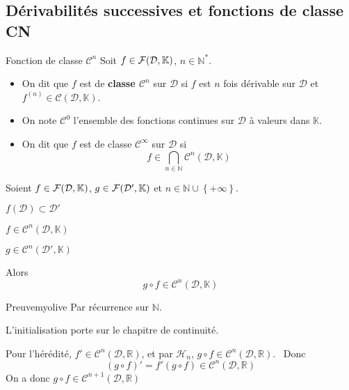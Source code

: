 \subsection{Dérivabilités successives et fonctions de classe CN}

    \begin{defi}{Fonction de classe $\mathcal{C}^n$}{}
        Soit $f \in \mathcal{F}(\mathcal{D},\mathbb{K})$, $n \in \mathbb{N}^*$.
        \begin{itemize}
            \item On dit que $f$ est de \textbf{classe $\mathcal{C}^n$} sur $\mathcal{D}$ si $f$ est $n$ fois dérivable sur $\mathcal{D}$ et $f^{(n)} \in \mathcal{C}(\mathcal{D},\mathbb{K})$.
            \item On note $\mathcal{C}^0$ l’ensemble des fonctions continues sur $\mathcal{D}$ à valeurs dans $\mathbb{K}$.
            \item On dit que $f$ est de classe $\mathcal{C}^{\infty}$ sur $\mathcal{D}$ si \[ f \in \bigcap\limits_{n \in \mathbb{N}} \mathcal{C}^n(\mathcal{D},\mathbb{K}) \]
        \end{itemize}
    \end{defi}

    \begin{prop}{}{}
        Soient $f \in \mathcal{F}(\mathcal{D},\mathbb{K})$, $g \in \mathcal{F}(\mathcal{D'},\mathbb{K})$ et $n \in \mathbb{N} \cup \left\{ + \infty \right\}$. 

        \begin{suppose}
            \item $f(\mathcal{D}) \subset \mathcal{D}'$
            \item $f \in \mathcal{C}^n(\mathcal{D},\mathbb{K})$
            \item $g \in \mathcal{C}^n(\mathcal{D}',\mathbb{K})$
        \end{suppose}

        Alors \[ g \circ f \in \mathcal{C}^n(\mathcal{D},\mathbb{K}) \]
    \end{prop}

    \begin{demo}{Preuve}{myolive}
        Par récurrence sur $\mathbb{N}$.
        
        L’initialisation porte sur le chapitre de continuité.
        
        Pour l’hérédité, $f' \in \mathcal{C}^n(\mathcal{D},\mathbb{R})$, et par $\mathcal{H}_n$, $g \circ f \in \mathcal{C}^n(\mathcal{D},\mathbb{R})$. 
        \
        Donc \[ (g \circ f)' = f' (g \circ f) \in \mathcal{C}^n(\mathcal{D},\mathbb{R}) \] 
        On a donc $g \circ f \in \mathcal{C}^{n+1}(\mathcal{D},\mathbb{R})$
    \end{demo}

